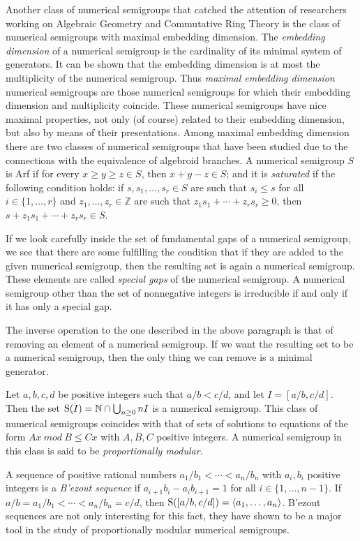 \documentclass[a4paper,11pt]{report}
\begin{document}
{ Another class of numerical semigroups that catched the attention of
researchers working on Algebraic Geometry and Commutative Ring Theory is the
class of numerical semigroups with maximal embedding dimension. The \emph{embedding dimension} of a numerical semigroup is the cardinality of its minimal system of
generators. It can be shown that the embedding dimension is at most the
multiplicity of the numerical semigroup. Thus \emph{maximal embedding dimension} numerical semigroups are those numerical semigroups for which their embedding
dimension and multiplicity coincide. These numerical semigroups have nice
maximal properties, not only (of course) related to their embedding dimension,
but also by means of their presentations. Among maximal embedding dimension
there are two classes of numerical semigroups that have been studied due to
the connections with the equivalence of algebroid branches. A numerical
semigroup $S$ is Arf if for every $x\geq y\geq z\in S$, then $x+y-z\in S$; and it is \emph{saturated} if the following condition holds: if $s,s_1,\ldots,s_r\in S$ are such that $s_i\leq s$ for all $i\in \{1,\ldots,r\}$ and $z_1,\ldots,z_r\in {\mathbb Z}$ are such that $z_1s_1+\cdots+z_rs_r\geq 0$, then $s+z_1s_1+\cdots +z_rs_r\in S$. 

 If we look carefully inside the set of fundamental gaps of a numerical
semigroup, we see that there are some fulfilling the condition that if they
are added to the given numerical semigroup, then the resulting set is again a
numerical semigroup. These elements are called \label{lab3}\emph{special gaps} of the numerical semigroup. A numerical semigroup other than the set of
nonnegative integers is irreducible if and only if it has only a special gap. 

 The inverse operation to the one described in the above paragraph is that of
removing an element of a numerical semigroup. If we want the resulting set to
be a numerical semigroup, then the only thing we can remove is a minimal
generator. 

 Let $a,b,c,d$ be positive integers such that $a/b < c/d$, and let $I=[a/b,c/d]$. Then the set ${\rm S}(I)={\mathbb N}\cap \bigcup_{n\geq 0} n I$ is a numerical semigroup. This class of numerical semigroups coincides with
that of sets of solutions to equations of the form $ A x \ mod\ B \leq C x$ with $ A,B,C$ positive integers. A numerical semigroup in this class is said to be \label{llab1}\emph{proportionally modular}. 

 A sequence of positive rational numbers $ a_1/b_1 < \cdots < a_n/b_n$ with $a_i,b_i$ positive integers is a \emph{B{\a'e}zout sequence} if $ a_{i+1}b_i - a_i b_{i+1}=1$ for all $i\in \{1,\ldots,n-1\}$. If $ a/b=a_1/b_1 < \cdots < a_n/b_n =c/d$, then ${\rm S}([a/b,c/d])=\langle a_1,\ldots,a_n\rangle$. B{\a'e}zout sequences are not only interesting for this fact, they have
shown to be a major tool in the study of proportionally modular numerical
semigroups. 

}
\end{document}
